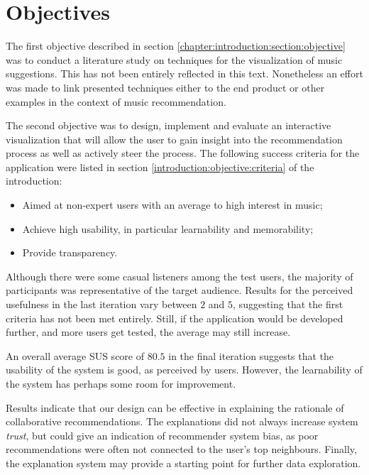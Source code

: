 \section{Objectives}

The first objective described in section \ref{chapter:introduction:section:objective} was to conduct a literature study on techniques for the visualization of music suggestions. This has not been entirely reflected in this text. Nonetheless an effort was made to link presented techniques either to the end product or other examples in the context of music recommendation.


The second objective was to design, implement and evaluate an interactive visualization that will allow the user to gain insight into the recommendation process as well as actively steer the process. The following success criteria for the application were listed in section \ref{introduction:objective:criteria} of the introduction:

\begin{itemize}
	\item Aimed at non-expert users with an average to high interest in music;
	\item Achieve high usability, in particular learnability and memorability;
	\item Provide transparency.
\end{itemize}

Although there were some casual listeners among the test users, the majority of participants was representative of the target audience. Results for the perceived usefulness in the last iteration vary between $2$ and $5$, suggesting that the first criteria has not been met entirely. Still, if the application would be developed further, and more users get tested, the average may still increase.

An overall average SUS score of $80.5$ in the final iteration suggests that the usability of the system is good, as perceived by users. However, the learnability of the system has perhaps some room for improvement.

Results indicate that our design can be effective in explaining the rationale of collaborative recommendations. The explanations did not always increase system \emph{trust}, but could give an indication of recommender system bias, as poor recommendations were often not connected to the user's top neighbours. Finally, the explanation system may provide a starting point for further data exploration.

